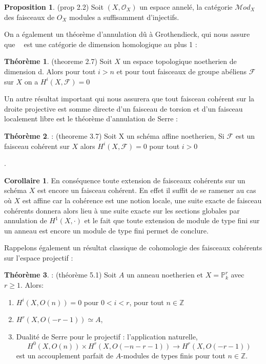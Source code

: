 \documentclass[12pt]{article}
\DeclareMathOperator{\coh}{Coh(\mathbb{P}_{k}^{1})}
\theoremstyle{definition}
\newtheorem{theo}{Théorème}[section]
\newtheorem{Prop}{Proposition}[section]
\newtheorem{cor}{Corollaire}[section]
\begin{document}
\begin{Prop}\label{suffinj}\textnormal{\cite{Hart}(prop 2.2) Soit $(X,\mathcal{O}_{X})$ un espace annelé, la catégorie $\mathcal{M}od_{X}$ des faisceaux de $O_{X}$ modules a suffisamment d'injectifs.}\end{Prop} On a également un théorème d'annulation dû à Grothendieck, qui nous assure que $\coh$ est une catégorie de dimension homologique au plus 1 : 
\begin{theo}\label{dim1}\textnormal{\cite{Hart}(theoreme 2.7) Soit $X$ un espace topologique noetherien de dimension d. Alors pour tout $i>n$ et pour tout faisceaux de groupe abéliens $\mathcal{F}$ sur $X$ on a $H^{i}(X,\mathcal{F})=0$}\end{theo}
Un autre résultat important qui nous assurera que tout faisceau cohérent sur la droite projective est somme directe d'un faisceau de torsion et d'un faisceau localement libre est le théorème d'annulation de Serre :
\begin{theo}: \textnormal{ \cite{Hart}(theoreme 3.7) Soit X un schéma affine noetherien, Si $\mathcal{F}$ est un faisceau cohérent sur $X$ alors $H^{i}(X,\mathcal{F})=0$ pour tout $i>0$}\end{theo}.
\begin{cor}\label{corser} En conséquence toute extension de faisceaux cohérents sur un schéma $X$ est encore un faisceau cohérent. En effet il suffit de se ramener au cas où $X$ est affine car la cohérence est une notion locale, une suite exacte de faisceau cohérents donnera alors lieu à une suite exacte sur les sections globales par annulation de $H^{1}(X,\cdot)$ et le fait que toute extension de module de type fini sur un anneau est encore un module de type fini permet de conclure.\end{cor}\newpage
Rappelons également un résultat classique de cohomologie des faisceaux cohérents sur l'espace projectif :
\begin{theo}:\label{CohoPn}\cite{Hart} (théorème 5.1) Soit $A$ un anneau noetherien et $X=\mathbb{P}^{r}_{k}$ avec $r\geqslant 1$. Alors:\begin{enumerate}
\item $H^{i}(X,O(n))=0$ pour $0<i<r$, pour tout $n\in\mathbb{Z}$
\item $H^{r}(X,O(-r-1))\simeq A$,
\item Dualité de Serre pour le projectif : l'application naturelle, $$H^{0}(X,O(n))\times H^{r}(X,O(-n-r-1))\to H^{r}(X,O(-r-1))$$ est un accouplement parfait de $A$-modules de types finis pour tout $n\in\mathbb{Z}$.
\end{enumerate}
\end{theo}
\end{document}
